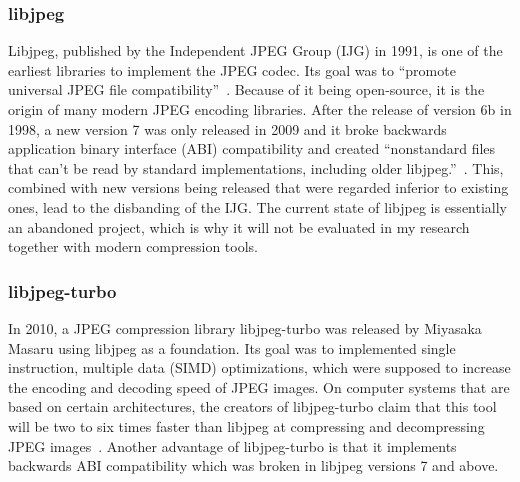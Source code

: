 \documentclass[12pt]{article}
\begin{document}
\subsubsection{libjpeg} \label{libjpeg}
Libjpeg, published by the Independent JPEG Group (IJG) in 1991, is one of the earliest libraries to implement the JPEG codec. Its goal was to ``promote universal
JPEG file compatibility''~\cite{tomlanejpeg9}. Because of it being open-source, it is the origin of many modern JPEG encoding libraries. After the release of version 6b in 1998, a new version 7 was only released in 2009 and it broke backwards application binary interface (ABI) compatibility and created ``nonstandard files that can't be read by standard implementations, including older libjpeg.''~\cite{tomlanejpeg9}. This, combined with new versions being released that were regarded inferior to existing ones, lead to the disbanding of the IJG. The current state of libjpeg is essentially an abandoned project, which is why it will not be evaluated in my research together with modern compression tools.

\subsubsection{libjpeg-turbo} \label{libjpeg-turbo}
In 2010, a JPEG compression library libjpeg-turbo was released by Miyasaka Masaru using libjpeg as a foundation. Its goal was to implemented single instruction, multiple data (SIMD) optimizations, which were supposed to increase the encoding and decoding speed of JPEG images. On computer systems that are based on certain architectures, the creators of libjpeg-turbo claim that this tool will be two to six times faster than libjpeg at compressing and decompressing JPEG images~\cite{libjpeg-turbo}. Another advantage of libjpeg-turbo is that it implements backwards ABI compatibility which was broken in libjpeg versions 7 and above.
\end{document}
